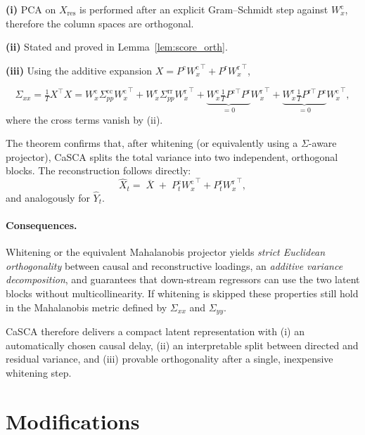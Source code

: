 \documentclass[14pt]{extarticle}
\begin{document}
	\begin{Proof}
		\textbf{(i)}  PCA on \(X_{\mathrm{res}}\) is performed after an
		explicit Gram–Schmidt step against \(W_x^{\mathrm c}\), therefore the
		column spaces are orthogonal.
		
		\textbf{(ii)}  Stated and proved in Lemma~\ref{lem:score_orth}.
		
		\textbf{(iii)}  Using the additive expansion
		\(X = P^{\mathrm c}{W_x^{\mathrm c}}^{\!\top} + P^{\mathrm r}{W_x^{\mathrm r}}^{\!\top}\),
		
		\[
		\Sigma_{xx}
		=\tfrac1T X^{\top}X
		= W_x^{\mathrm c}\Sigma_{pp}^{\mathrm{cc}}{W_x^{\mathrm c}}^{\!\top}
		+W_x^{\mathrm r}\Sigma_{pp}^{\mathrm{rr}}{W_x^{\mathrm r}}^{\!\top}
		+\underbrace{W_x^{\mathrm c}
			\tfrac1T P^{\mathrm c\!\top}P^{\mathrm r}}_{=0}
		{W_x^{\mathrm r}}^{\!\top}
		+\underbrace{W_x^{\mathrm r}
			\tfrac1T P^{\mathrm r\!\top}P^{\mathrm c}}_{=0}
		{W_x^{\mathrm c}}^{\!\top},
		\]
		where the cross terms vanish by (ii).
	\end{Proof}
	
	The theorem confirms that, after whitening (or equivalently using a
	$\Sigma$-aware projector), CaSCA splits the total variance into two
	independent, orthogonal blocks.
	The reconstruction follows directly:
	\[
	\widehat X_t
	= \;\overline{X}\;+\;
	P_t^{\mathrm c}{W_x^{\mathrm c}}^{\!\top}
	+P_t^{\mathrm r}{W_x^{\mathrm r}}^{\!\top},
	\]
	and analogously for \(\widehat Y_t\).
	
	\paragraph{Consequences.}
	Whitening or the equivalent Mahalanobis projector yields  
	\emph{strict Euclidean orthogonality} between causal and reconstructive
	loadings, an \emph{additive variance decomposition}, and guarantees that
	down-stream regressors can use the two latent blocks without
	multicollinearity.  
	If whitening is skipped these properties still hold in the Mahalanobis
	metric defined by \(\Sigma_{xx}\) and \(\Sigma_{yy}\).
	
	\bigskip
	\noindent
	CaSCA therefore delivers a compact latent representation with (i) an
	automatically chosen causal delay, (ii) an interpretable split between
	directed and residual variance, and (iii) provable orthogonality after a
	single, inexpensive whitening step.
	
	\section{Modifications} \label{sec:mods}
\end{document}
